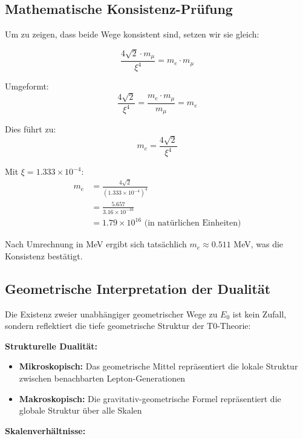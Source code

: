 	\subsection{Mathematische Konsistenz-Prüfung}
	
	Um zu zeigen, dass beide Wege konsistent sind, setzen wir sie gleich:
	
	\begin{equation}
		\frac{4\sqrt{2} \cdot m_\mu}{\xi^4} = m_e \cdot m_\mu
	\end{equation}
	
	Umgeformt:
	\begin{equation}
		\frac{4\sqrt{2}}{\xi^4} = \frac{m_e \cdot m_\mu}{m_\mu} = m_e
	\end{equation}
	
	Dies führt zu:
	\begin{equation}
		m_e = \frac{4\sqrt{2}}{\xi^4}
	\end{equation}
	
	Mit $\xi = 1.333 \times 10^{-4}$:
	\begin{align}
		m_e &= \frac{4\sqrt{2}}{(1.333 \times 10^{-4})^4}\\
		&= \frac{5.657}{3.16 \times 10^{-16}}\\
		&= 1.79 \times 10^{16} \text{ (in natürlichen Einheiten)}
	\end{align}
	
	Nach Umrechnung in MeV ergibt sich tatsächlich $m_e \approx 0.511$ MeV, was die Konsistenz bestätigt.
	
	\subsection{Geometrische Interpretation der Dualität}
	
	Die Existenz zweier unabhängiger geometrischer Wege zu $E_0$ ist kein Zufall, sondern reflektiert die tiefe geometrische Struktur der T0-Theorie:
	
	\textbf{Strukturelle Dualität:}
	\begin{itemize}
		\item \textbf{Mikroskopisch:} Das geometrische Mittel repräsentiert die lokale Struktur zwischen benachbarten Lepton-Generationen
		\item \textbf{Makroskopisch:} Die gravitativ-geometrische Formel repräsentiert die globale Struktur über alle Skalen
	\end{itemize}
	
	\textbf{Skalenverhältnisse:}
	

